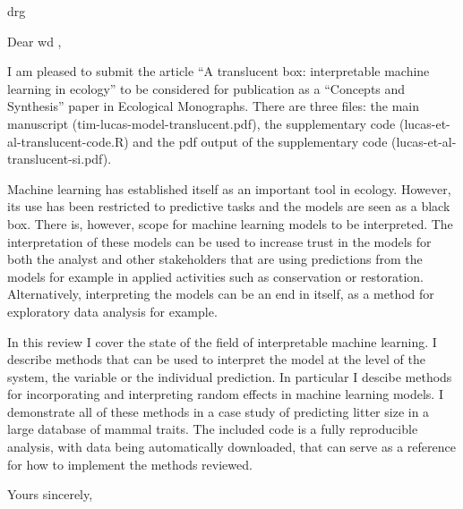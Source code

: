 \documentclass[10pt, a4paper]{letter} %
\begin{document}

\begin{letter}{
drg
}


\opening{Dear wd ,}

I am pleased to submit the article ``A translucent box: interpretable machine learning in ecology'' to be considered for publication as a ``Concepts and Synthesis'' paper in Ecological Monographs.
There are three files: the main manuscript (tim-lucas-model-translucent.pdf), the supplementary code (lucas-et-al-translucent-code.R) and the pdf output of the supplementary code (lucas-et-al-translucent-si.pdf).

Machine learning has established itself as an important tool in ecology.
However, its use has been restricted to predictive tasks and the models are seen as a black box.
There is, however, scope for machine learning models to be interpreted.
The interpretation of these models can be used to increase trust in the models for both the analyst and other stakeholders that are using predictions from the models for example in applied activities such as conservation or restoration.
Alternatively, interpreting the models can be an end in itself, as a method for exploratory data analysis for example.

In this review I cover the state of the field of interpretable machine learning.
I describe methods that can be used to interpret the model at the level of the system, the variable or the individual prediction.
In particular I descibe methods for incorporating and interpreting random effects in machine learning models.
I demonstrate all of these methods in a case study of predicting litter size in a large database of mammal traits.
The included code is a fully reproducible analysis, with data being automatically downloaded, that can serve as a reference for how to implement the methods reviewed.



\closing{Yours sincerely,}




\end{letter}
\end{document}
